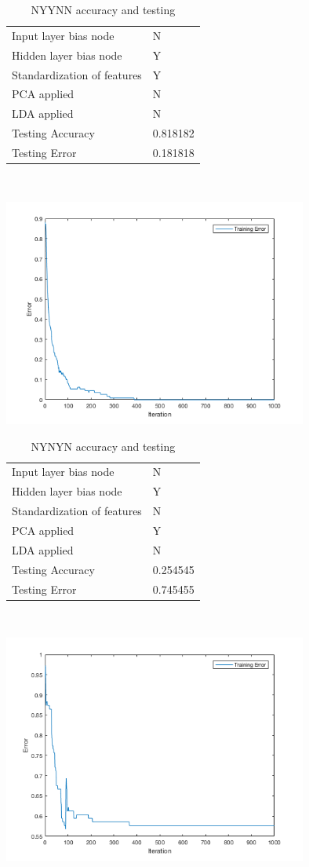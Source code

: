 \documentclass[12pt]{article}
\newcommand{\accuracyAndTestErrorTable}[8]{
  \begin{tabular}{l|l}
    \hline
    Input layer bias node & #1 \\
    Hidden layer bias node & #2 \\
    Standardization of features & #3 \\
    PCA applied & #4 \\
    LDA applied & #5 \\
    \hline
    Testing Accuracy & #6 \\
    Testing Error & #7 \\
    \hline
  \end{tabular}
  ~\\[60pt]
  \caption{#8}
}
\begin{document}


\begin{center}
  \begin{table}[H]
    \begin{varwidth}[b]{0.4\linewidth}
      \centering
      \accuracyAndTestErrorTable{N}{Y}{Y}{N}{N}{0.818182}{0.181818}{NYYNN accuracy and testing}
      \label{table:NYYNN}
    \end{varwidth}%
    \hfill
    \begin{minipage}[b]{0.6\linewidth}
      \centering
      \includegraphics[width=100mm]{NYYNN_training_error.png}
      \label{fig:NYYNN}
    \end{minipage}
  \end{table}
\end{center}

\begin{center}
  \begin{table}[H]
    \begin{varwidth}[b]{0.4\linewidth}
      \centering
      \accuracyAndTestErrorTable{N}{Y}{N}{Y}{N}{0.254545}{0.745455}{NYNYN accuracy and testing}
      \label{table:NYNYN}
    \end{varwidth}%
    \hfill
    \begin{minipage}[b]{0.6\linewidth}
      \centering
      \includegraphics[width=100mm]{NYNYN_training_error.png}
      \label{fig:NYNYN}
    \end{minipage}
  \end{table}
\end{center}
\end{document}
